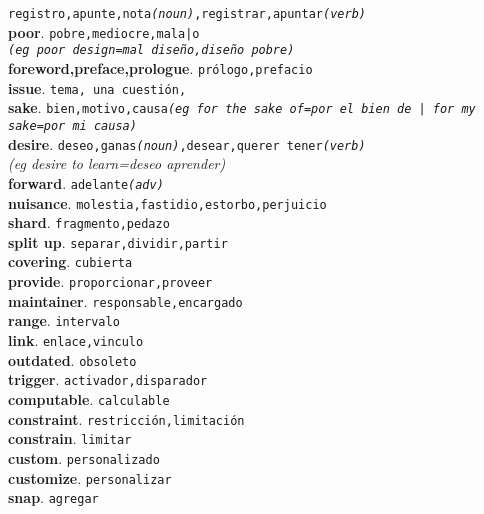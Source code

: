 \documentclass[twocolumn]{article}
\begin{document}
        \texttt{registro,apunte,nota{\scriptsize \textsl{(noun)}},registrar,apuntar{\scriptsize \textsl{(verb)}}}\\
	\textsf{\textbf{poor}}. \texttt{pobre,mediocre,mala|o\\{\scriptsize \textsl{(eg poor design=mal dise\~no,dise\~no pobre)}}}\\
	\textsf{\textbf{foreword,preface,prologue}}. \texttt{pr\'ologo,prefacio}\\
	\textsf{\textbf{issue}}. \texttt{tema, una cuesti\'on,}\\
	\textsf{\textbf{sake}}. \texttt{bien,motivo,causa{\scriptsize \textsl{(eg for the sake of=por el bien de | for my sake=por mi causa)}}}\\
	\textsf{\textbf{desire}}. \texttt{deseo,ganas{\scriptsize \textsl{(noun)}},desear,querer tener{\scriptsize \textsl{(verb)}}}\\{\scriptsize \textsl{(eg desire to learn=deseo aprender)}}\\
	\textsf{\textbf{forward}}. \texttt{adelante{\scriptsize \textsl{(adv)}}}\\
	\textsf{\textbf{nuisance}}. \texttt{molestia,fastidio,estorbo,perjuicio}\\
	\textsf{\textbf{shard}}. \texttt{fragmento,pedazo}\\
	\textsf{\textbf{split up}}. \texttt{separar,dividir,partir}\\
	\textsf{\textbf{covering}}. \texttt{cubierta}\\
	\textsf{\textbf{provide}}. \texttt{proporcionar,proveer}\\
	\textsf{\textbf{maintainer}}. \texttt{responsable,encargado}\\
	\textsf{\textbf{range}}. \texttt{intervalo}\\
	\textsf{\textbf{link}}. \texttt{enlace,vinculo}\\
	\textsf{\textbf{outdated}}. \texttt{obsoleto}\\
	\textsf{\textbf{trigger}}. \texttt{activador,disparador}\\
	\textsf{\textbf{computable}}. \texttt{calculable}\\
	\textsf{\textbf{constraint}}. \texttt{restricci\'on,limitaci\'on}\\
	\textsf{\textbf{constrain}}. \texttt{limitar}\\
	\textsf{\textbf{custom}}. \texttt{personalizado}\\
	\textsf{\textbf{customize}}. \texttt{personalizar}\\
	\textsf{\textbf{snap}}. \texttt{agregar}\\
\end{document}
